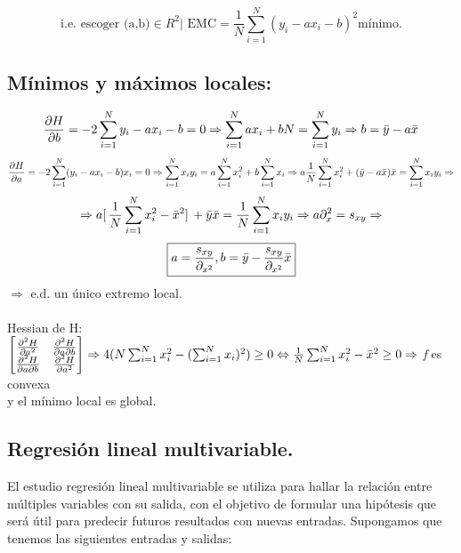 \documentclass[a4paper,10pt]{article}
\begin{document}
\[ \text{i.e. escoger (a,b)} \in R^2 | \text{ EMC} = \frac{1}{N} \sum_{i=1}^{N}(y_{i}-ax_{i}-b)^2 \text{mínimo.} \]
\subsection{Mínimos y máximos locales:}
\[\frac{\partial{H}}{\partial{b}}=-2\sum_{i=1}^{N}y_{i}-ax_{i}-b=0\Rightarrow \sum_{i=1}^{N}ax_{i}+bN=\sum_{i=1}^{N}y_{i}\Rightarrow b=\Bar{y}-a\Bar{x}\]
\[\frac{\partial{H}}{\partial{a}}=-2\sum_{i=1}^{N}(y_{i}-ax_{i}-b)x_{i}=0\Rightarrow \sum_{i=1}^{N}x_{i}y_{i}=a\sum_{i=1}^{N}x_{i}^2+b\sum_{i=1}^{N}x_{i}\Rightarrow a \frac{1}{N}\sum_{i=1}^{N}x_{i}^2+(\Bar{y}-a\Bar{x})\Bar{x}=\sum_{i=1}^{N}x_{i}y_{i}\Rightarrow\] 
\[\Rightarrow a[ \,\frac{1}{N} \sum_{i=1}^{N} x_{i}^2-\Bar{x}^2] \,+\Bar{y}\Bar{x}=\frac{1}{N}\sum_{i=1}^{N}x_{i}y_{i}\Rightarrow a\partial_x^2=s_{xy}\Rightarrow\]
\[\boxed{a=\frac{s_{xy}}{\partial_{x^2}}, b=\Bar{y}-\frac{s_{xy}}{\partial_{x^2}}\Bar{x}}\]
$\Rightarrow$ e.d. un único extremo local.\\
\\
Hessian de H: $
\begin{bmatrix}
    \frac{\partial^2 H}{\partial a^2} & \frac{\partial^2 H}{\partial a \partial b} \\
    \frac{\partial^2 H}{\partial a \partial b} & \frac{\partial^2 H}{\partial a^2}
\end{bmatrix} \Rightarrow 4(N\sum_{i=1}^{N}x_{i}^2-(\sum_{i=1}^{N}x_{i})^2)\geq 0 \Leftrightarrow \frac{1}{N}\sum_{i=1}^{N}x_{i}^2 - \Bar{x}^2 \geq 0 \Rightarrow$ \textit{f} es convexa \\ y el mínimo local es global.

\subsection{Regresión lineal multivariable.}

El estudio regresión lineal multivariable se utiliza para hallar la relación entre múltiples variables con su salida, con el objetivo de formular una hipótesis que será útil para predecir futuros resultados con nuevas entradas. Supongamos que tenemos las siguientes entradas y salidas: 
\end{document}
